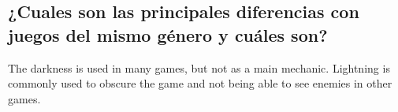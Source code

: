 \begin{multicols}{2}
\section{¿Cuales son las principales diferencias con juegos del mismo género y cuáles son?}
The darkness is used in many games, but not as a main mechanic. Lightning is commonly used to obscure the game and not being able to see enemies in other games.

\end{multicols}